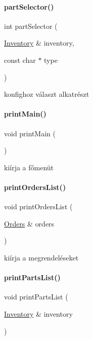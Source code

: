 \paragraph{\texorpdfstring{partSelector()}{partSelector()}}
{\footnotesize\ttfamily int part\+Selector (\begin{DoxyParamCaption}\item[{\mbox{\hyperlink{class_inventory}{Inventory}} \&}]{inventory,  }\item[{const char $\ast$}]{type }\end{DoxyParamCaption})}



konfighoz választ alkatrészt 

\mbox{\label{_menu_8cpp_aa8348016f7273e63d47917126e8f9c69}} 
\paragraph{\texorpdfstring{printMain()}{printMain()}}
{\footnotesize\ttfamily void print\+Main (\begin{DoxyParamCaption}{ }\end{DoxyParamCaption})}



kiírja a főmenüt 

\mbox{\label{_menu_8cpp_a2279d427508487e2c7194ba68588445d}} 
\paragraph{\texorpdfstring{printOrdersList()}{printOrdersList()}}
{\footnotesize\ttfamily void print\+Orders\+List (\begin{DoxyParamCaption}\item[{\mbox{\hyperlink{class_orders}{Orders}} \&}]{orders }\end{DoxyParamCaption})}



kiírja a megrendeléseket 

\mbox{\label{_menu_8cpp_a70c4e63bce818eb0a35f6403066b4263}} 
\paragraph{\texorpdfstring{printPartsList()}{printPartsList()}}
{\footnotesize\ttfamily void print\+Parts\+List (\begin{DoxyParamCaption}\item[{\mbox{\hyperlink{class_inventory}{Inventory}} \&}]{inventory }\end{DoxyParamCaption})}



